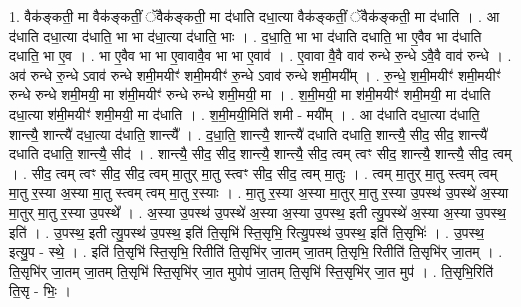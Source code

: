 \documentclass[17pt]{extarticle}
\begin{document}
1. वैक॑ङ्कती॒ मा वैक॑ङ्कतीं॒ ॅवैक॑ङ्कती॒ मा द॑धाति दधा॒त्या वैक॑ङ्कतीं॒ ॅवैक॑ङ्कती॒ मा द॑धाति । . आ द॑धाति दधा॒त्या द॑धाति॒ भा भा द॑धा॒त्या द॑धाति॒ भाः । . द॒धा॒ति॒ भा भा द॑धाति दधाति॒ भा ए॒वैव भा द॑धाति दधाति॒ भा ए॒व । . भा ए॒वैव भा भा ए॒वावावै॒व भा भा ए॒वाव॑ । . ए॒वावा वै॒वै वाव॑ रुन्धे रु॒न्धे ऽवै॒वै वाव॑ रुन्धे । . अव॑ रुन्धे रु॒न्धे ऽवाव॑ रुन्धे शमी॒मयीꣳ॑ शमी॒मयीꣳ॑ रु॒न्धे ऽवाव॑ रुन्धे शमी॒मयी᳚म् । . रु॒न्धे॒ श॒मी॒मयीꣳ॑ शमी॒मयीꣳ॑ रुन्धे रुन्धे शमी॒मयी॒ मा श॑मी॒मयीꣳ॑ रुन्धे रुन्धे शमी॒मयी॒ मा । . श॒मी॒मयी॒ मा श॑मी॒मयीꣳ॑ शमी॒मयी॒ मा द॑धाति दधा॒त्या श॑मी॒मयीꣳ॑ शमी॒मयी॒ मा द॑धाति । . श॒मी॒मयी॒मिति॑ शमी - मयी᳚म् । . आ द॑धाति दधा॒त्या द॑धाति॒ शान्त्यै॒ शान्त्यै॑ दधा॒त्या द॑धाति॒ शान्त्यै᳚ । . द॒धा॒ति॒ शान्त्यै॒ शान्त्यै॑ दधाति दधाति॒ शान्त्यै॒ सीद॒ सीद॒ शान्त्यै॑ दधाति दधाति॒ शान्त्यै॒ सीद॑ । . शान्त्यै॒ सीद॒ सीद॒ शान्त्यै॒ शान्त्यै॒ सीद॒ त्वम् त्वꣳ सीद॒ शान्त्यै॒ शान्त्यै॒ सीद॒ त्वम् । . सीद॒ त्वम् त्वꣳ सीद॒ सीद॒ त्वम् मा॒तुर् मा॒तु स्त्वꣳ सीद॒ सीद॒ त्वम् मा॒तुः । . त्वम् मा॒तुर् मा॒तु स्त्वम् त्वम् मा॒तु र॒स्या अ॒स्या मा॒तु स्त्वम् त्वम् मा॒तु र॒स्याः । . मा॒तु र॒स्या अ॒स्या मा॒तुर् मा॒तु र॒स्या उ॒पस्थ॑ उ॒पस्थे॑ अ॒स्या मा॒तुर् मा॒तु र॒स्या उ॒पस्थे᳚ । . अ॒स्या उ॒पस्थ॑ उ॒पस्थे॑ अ॒स्या अ॒स्या उ॒पस्थ॒ इती त्यु॒पस्थे॑ अ॒स्या अ॒स्या उ॒पस्थ॒ इति॑ । . उ॒पस्थ॒ इती त्यु॒पस्थ॑ उ॒पस्थ॒ इति॑ ति॒सृभि॑ स्ति॒सृभि॒ रित्यु॒पस्थ॑ उ॒पस्थ॒ इति॑ ति॒सृभिः॑ । . उ॒पस्थ॒ इत्यु॒प - स्थे॒ । . इति॑ ति॒सृभि॑ स्ति॒सृभि॒ रितीति॑ ति॒सृभि॑र् जा॒तम् जा॒तम् ति॒सृभि॒ रितीति॑ ति॒सृभि॑र् जा॒तम् । . ति॒सृभि॑र् जा॒तम् जा॒तम् ति॒सृभि॑ स्ति॒सृभि॑र् जा॒त मुपोप॑ जा॒तम् ति॒सृभि॑ स्ति॒सृभि॑र् जा॒त मुप॑ । . ति॒सृभि॒रिति॑ ति॒सृ - भिः॒ । \newline
\end{document}
